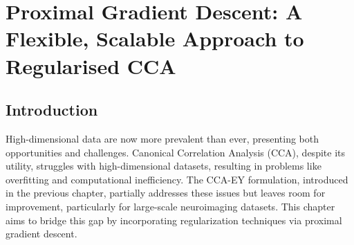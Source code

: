 \chapter{Proximal Gradient Descent: A Flexible, Scalable Approach to Regularised CCA}
\label{ch:proximal-gradient-descent}
\minitoc




\section{Introduction}

High-dimensional data are now more prevalent than ever, presenting both opportunities and challenges.
Canonical Correlation Analysis (CCA), despite its utility, struggles with high-dimensional datasets, resulting in problems like overfitting and computational inefficiency.
The CCA-EY formulation, introduced in the previous chapter, partially addresses these issues but leaves room for improvement, particularly for large-scale neuroimaging datasets.
This chapter aims to bridge this gap by incorporating regularization techniques via proximal gradient descent.

